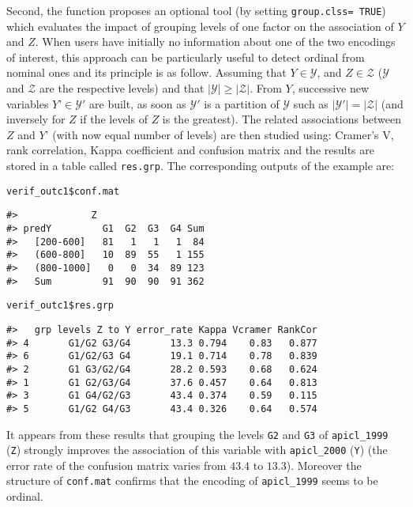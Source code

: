 Second, the function proposes an optional tool (by setting \texttt{group.clss=\ TRUE}) which evaluates the impact of grouping levels of one factor on the association of \(Y\) and \(Z\). When users have initially no information about one of the two encodings of interest, this approach can be particularly useful to detect ordinal from nominal ones and its principle is as follow. Assuming that \(Y \in \mathcal{Y}\), and \(Z \in \mathcal{Z}\) (\(\mathcal{Y}\) and \(\mathcal{Z}\) are the respective levels) and that \(|\mathcal{Y}| \geq |\mathcal{Z}|\). From \(Y\), successive new variables \(Y’ \in \mathcal{Y}'\) are built, as soon as \(\mathcal{Y}'\) is a partition of \(\mathcal{Y}\) such as \(|\mathcal{Y}'| = |\mathcal{Z}|\) (and inversely for \(Z\) if the levels of \(Z\) is the greatest). The related associations between \(Z\) and \(Y’\) (with now equal number of levels) are then studied using: Cramer's V, rank correlation, Kappa coefficient and confusion matrix and the results are stored in a table called \texttt{res.grp}. The corresponding outputs of the example are:

\begin{verbatim}
verif_outc1$conf.mat
\end{verbatim}

\begin{verbatim}
#>             Z
#> predY         G1  G2  G3  G4 Sum
#>   [200-600]   81   1   1   1  84
#>   (600-800]   10  89  55   1 155
#>   (800-1000]   0   0  34  89 123
#>   Sum         91  90  90  91 362
\end{verbatim}

\begin{verbatim}
verif_outc1$res.grp
\end{verbatim}

\begin{verbatim}
#>   grp levels Z to Y error_rate Kappa Vcramer RankCor
#> 4       G1/G2 G3/G4       13.3 0.794    0.83   0.877
#> 6       G1/G2/G3 G4       19.1 0.714    0.78   0.839
#> 2       G1 G3/G2/G4       28.2 0.593    0.68   0.624
#> 1       G1 G2/G3/G4       37.6 0.457    0.64   0.813
#> 3       G1 G4/G2/G3       43.4 0.374    0.59   0.115
#> 5       G1/G2 G4/G3       43.4 0.326    0.64   0.574
\end{verbatim}

It appears from these results that grouping the levels \texttt{G2} and \texttt{G3} of \texttt{apicl\_1999} (\texttt{Z}) strongly improves the association of this variable with \texttt{apicl\_2000} (\texttt{Y}) (the error rate of the confusion matrix varies from \(43.4\) to \(13.3\)). Moreover the structure of \texttt{conf.mat} confirms that the encoding of \texttt{apicl\_1999} seems to be ordinal.

